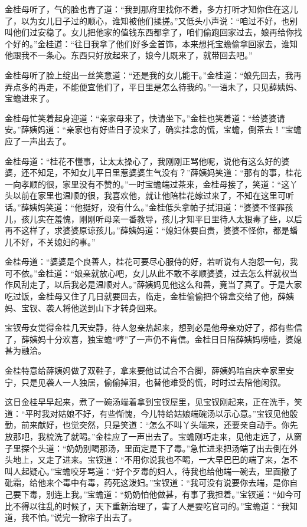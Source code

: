 \documentclass[12pt,oneside]{book}
\begin{document}
金桂母听了，气的脸也青了道：“我到那府里找你不着，多方打听才知你住在这儿了，以为女儿日子过的顺心，谁知被他们揉搓。”又低头小声说：“咱过不好，也别叫他们过安稳了。女儿把他家的值钱东西都拿了，咱们偷跑回家过去，娘再给你找个好的。”金桂道：“往日我拿了他们好多金首饰，本来想托宝蟾偷拿回家去，谁知他跟我不一条心。东西只好放起来了，娘今儿既来了，就带回去吧。”

金桂母听了脸上绽出一丝笑意道：“还是我的女儿能干。”金桂道：“娘先回去，我再弄点多的再走，不能便宜他们了，平日里是怎么待我的。”一语未了，只见薛姨妈、宝蟾进来了。

金桂母忙笑着起身迎道：“亲家母来了，快请坐下。”金桂也笑着道：“给婆婆请安。”薛姨妈道：“亲家也有好些日子没来了，确实挂念的慌，宝蟾，倒茶去！”宝蟾应了一声出去了。

金桂母道：“桂花不懂事，让太太操心了，我刚刚正骂他呢，说他有这么好的婆婆，还不知足，不知女儿平日里惹婆婆生气没有？”薛姨妈笑道：“那有的事，桂花一向孝顺的很，家里没有不赞的。”一时宝蟾端过茶来，金桂母接了，笑道：“这丫头以前在家里也温顺的很，我喜欢他，就让他陪桂花嫁过来了，不知在这里可听话。”薛姨妈笑道：“他挺好，没有什么。”金桂低头拿帕子拭泪道：“婆婆不怪罪孩儿，孩儿实在羞愧，刚刚听母亲一番教导，孩儿才知平日里待人太狠毒了些，以后再不这样了，求婆婆原谅孩儿。”薛姨妈道：“媳妇休要自责，婆婆不怪你，都是蟠儿不好，不关媳妇的事。”

金桂母道：“婆婆是个良善人，桂花可要尽心服侍的好，若听说有人抱怨一句，我可不依。”金桂道：“娘亲就放心吧，女儿从此不敢不孝顺婆婆，过去怎么样就权当作风刮走了，以后我必是温顺对人。”薛姨妈见他这么和善，竟当了真了。于是大家吃过饭，金桂母又住了几日就要回去，临走，金桂偷偷把个锦盒交给了他，薛姨妈、宝钗、袭人将他送到山下才转身回来。

宝钗母女觉得金桂几天安静，待人忽亲热起来，想到必是他母亲劝好了，都有些信了，薛姨妈十分欢喜，独宝蟾“哼”了一声仍不肯信。金桂日日陪薛姨妈唠嗑，婆媳甚为融洽。

金桂特意给薛姨妈做了双鞋子，拿来要他试试合不合脚，薛姨妈暗自庆幸家里安宁，只是见袭人一人独居，偷偷掉泪，也替他难受的慌，时时过去陪他闲叙。

这日金桂早早起来，煮了一碗汤端着拿到宝钗屋里，见宝钗刚起来，正在洗手，笑道：“平时我对姑娘不好，有些惭愧，今儿特给姑娘端碗汤以示心意。”宝钗见他殷勤，前来献好，也觉突然，只是笑道：“怎么不叫丫头端来，还要亲自动手。你先放那吧，我梳洗了就喝。”金桂应了一声出去了。宝蟾刚巧走来，见他走远了，从窗子里探个头道：“奶奶别喝那汤，里面定是下了毒。”急忙进来把汤端了出去倒在外头地上，又走了进来。宝钗道：“不用你说我也不喝，一大早巴巴的端了来，怎不叫人起疑心。”宝蟾咬牙骂道：“好个歹毒的妇人，待我也给他端一碗去，里面撒了砒霜，给他来个毒中有毒，药死这泼妇。”宝钗道：“我可没有说要你去端，是你自己要下毒，别连上我。”宝蟾道：“奶奶怕他做甚，有事了我担着。”宝钗道：“如今可比不得以往乱的时候了，天下重新治理了，害了人是要吃官司的。”宝蟾道：“我知道，我不怕。”说完一掀帘子出去了。
\end{document}

